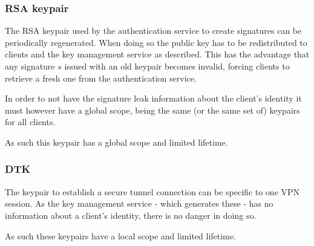 \documentclass[a4paper]{scrreprt}
\begin{document}
\subsubsection{RSA keypair}

The RSA keypair used by the authentication service to create signatures can be
periodically regenerated. When doing so the public key has to be redistributed
to clients and the key management service as described. This has the advantage
that any signature $s$ issued with an old keypair becomes invalid, forcing
clients to retrieve a fresh one from the authentication service.

In order to not have the signature leak information about the client's identity
it must however have a global scope, being the same (or the same set of)
keypairs for all clients.

As such this keypair has a global scope and limited lifetime.

\subsubsection{DTK}

The keypair to establish a secure tunnel connection can be specific to one
VPN session. As the key management service - which generates these - has
no information about a client's identity, there is no danger in doing so.

As such these keypairs have a local scope and limited lifetime.
\end{document}
